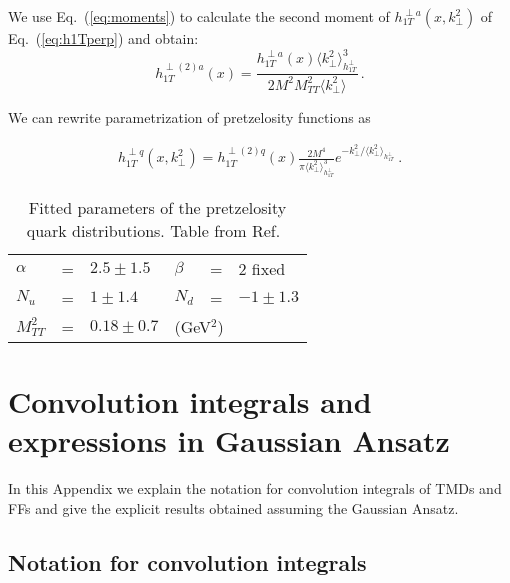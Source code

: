 \documentclass[a4paper,11pt]{article}
\newcommand{\be}{\begin{equation}}
\newcommand{\ee}{\end{equation}}
\newcommand{\ba}{\begin{eqnarray}}
\newcommand{\ea}{\end{eqnarray}}
\newcommand{\la}{\langle}
\newcommand{\ra}{\rangle}
\def\kperp{k_\perp}
\def\avkperp{\la \kperp^2 \ra}
\begin{document}
  We use Eq.~(\ref{eq:moments}) to calculate the second moment of $ h_{1T}^{\perp a}(x,\kperp^2)$
of Eq.~(\ref{eq:h1Tperp}) and obtain:
\be
h_{1T}^{\perp (2) a}(x) =  \frac{h^{\perp a}_{1T}(x) \avkperp_{h_{1T}^\perp}^3}{2 M^2 M_{TT}^2 \avkperp} \, .
\ee

We can rewrite parametrization of pretzelosity   functions as

\ba
h_{1T}^{\perp q}(x,\kperp^2) =  h_{1T}^{\perp (2) q}(x)   \frac{2 M^4}{\pi \avkperp_{h_{1T}^\perp}^3} e^{-\kperp^2/{\avkperp_{h_{1T}^\perp}}}
\label{pretzelosity_new} \ .
\ea

%
\begin{table}[htb]
\centering
\begin{tabular}{l c l l c l}
\hline
$\alpha$ &=& $2.5\pm1.5$ & $\beta$ &=& $2$ fixed \\
 $N_{u}$ &=& $1 \pm 1.4$ & $N_{d}$ &=& $-1 \pm 1.3$\\
 $M_{TT}^2$ &=& $0.18 \pm  0.7$&\multicolumn{3}{l}{(GeV$^2$)}\\ 
\hline
\end{tabular}
\caption{Fitted parameters of the pretzelosity quark distributions. Table from Ref.~\cite{Lefky:2014eia}}
\label{fitparI}
\end{table}
%
 
\newpage
\section{Convolution integrals and expressions in Gaussian Ansatz}
\label{App:factor}

In this Appendix we explain the notation for convolution integrals
of TMDs and FFs and give the explicit results obtained assuming the
Gaussian Ansatz.

\subsection{Notation for convolution integrals \label{ApendixB1}}
 
\end{document}
